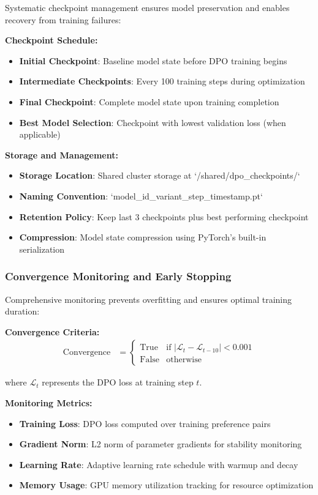 Systematic checkpoint management ensures model preservation and enables recovery from training failures:

\textbf{Checkpoint Schedule:}
\begin{itemize}
    \item \textbf{Initial Checkpoint}: Baseline model state before DPO training begins
    \item \textbf{Intermediate Checkpoints}: Every 100 training steps during optimization
    \item \textbf{Final Checkpoint}: Complete model state upon training completion
    \item \textbf{Best Model Selection}: Checkpoint with lowest validation loss (when applicable)
\end{itemize}

\textbf{Storage and Management:}
\begin{itemize}
    \item \textbf{Storage Location}: Shared cluster storage at `/shared/dpo_checkpoints/`
    \item \textbf{Naming Convention}: `{model_id}_{variant}_{step}_{timestamp}.pt`
    \item \textbf{Retention Policy}: Keep last 3 checkpoints plus best performing checkpoint
    \item \textbf{Compression}: Model state compression using PyTorch's built-in serialization
\end{itemize}

\subsubsection{Convergence Monitoring and Early Stopping}

Comprehensive monitoring prevents overfitting and ensures optimal training duration:

\textbf{Convergence Criteria:}
\begin{align}
\text{Convergence} &= \begin{cases}
\text{True} & \text{if } |\mathcal{L}_{t} - \mathcal{L}_{t-10}| < 0.001 \\
\text{False} & \text{otherwise}
\end{cases} \label{eq:convergence-criteria}
\end{align}

where $\mathcal{L}_{t}$ represents the DPO loss at training step $t$.

\textbf{Monitoring Metrics:}
\begin{itemize}
    \item \textbf{Training Loss}: DPO loss computed over training preference pairs
    \item \textbf{Gradient Norm}: L2 norm of parameter gradients for stability monitoring
    \item \textbf{Learning Rate}: Adaptive learning rate schedule with warmup and decay
    \item \textbf{Memory Usage}: GPU memory utilization tracking for resource optimization
\end{itemize}


